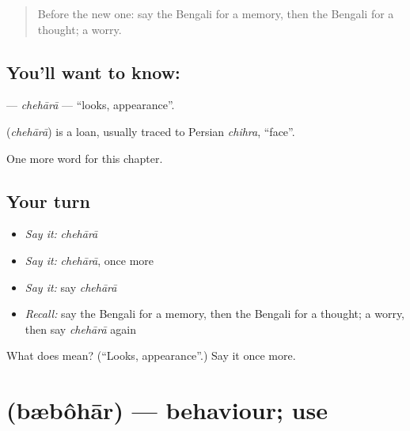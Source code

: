 \label{lesson:BN-C234-chehara}



\begin{quote}
Before the new one: say the Bengali for a memory, then the Bengali for a thought; a worry.
\end{quote}

\subsection*{You'll want to know: }
\textbf{} — \emph{chehārā} — \textquotedblleft{}looks, appearance\textquotedblright{}.

\begin{cousinweb}
\textbf{} (\emph{chehārā}) is a loan, usually traced to Persian \emph{chihra}, \textquotedblleft{}face\textquotedblright{}.
\end{cousinweb}

\begin{grammarlens}[title={What you've built}]
One more word for this chapter.
\end{grammarlens}

\subsection*{Your turn}
\begin{itemize}
\raggedright
  \item \emph{Say it:} \emph{chehārā}
  \item \emph{Say it:} \emph{chehārā}, once more
  \item \emph{Say it:} say \emph{chehārā}
  \item \emph{Recall:} say the Bengali for a memory, then the Bengali for a thought; a worry, then say \emph{chehārā} again
\end{itemize}

\begin{tcolorbox}[breakable,colback=teal!4,colframe=teal!35!black,title={Before you move on}]
What does  mean? (\textquotedblleft{}Looks, appearance\textquotedblright{}.) Say it once more.
\end{tcolorbox}
\section[\texorpdfstring{\bn{ব্যবহার} (bæbôhār)}{ব্যবহার (bæbôhār)}]{ (bæbôhār) — behaviour; use}

\label{lesson:BN-C234-bbohar}



